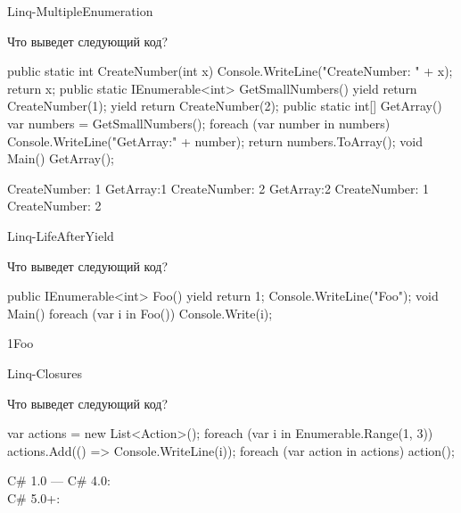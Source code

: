 \begin{defproblem}{Linq-MultipleEnumeration}
\begin{onlyproblem}
  Что выведет следующий код?
  \begin{source}
  public static int CreateNumber(int x)
  {
    Console.WriteLine("CreateNumber: " + x);
    return x;
  }
  public static IEnumerable<int> GetSmallNumbers()
  {    
    yield return CreateNumber(1);
    yield return CreateNumber(2);
  }
  public static int[] GetArray()
  {
    var numbers = GetSmallNumbers();
    foreach (var number in numbers)
      Console.WriteLine("GetArray:" + number);
    return numbers.ToArray();
  }
  void Main()
  {
    GetArray();
  }
  \end{source}
\end{onlyproblem}
\begin{onlysolution}
  \begin{source}
  CreateNumber: 1
  GetArray:1
  CreateNumber: 2
  GetArray:2
  CreateNumber: 1
  CreateNumber: 2
  \end{source}
\end{onlysolution}
\end{defproblem}
\begin{defproblem}{Linq-LifeAfterYield}
\begin{onlyproblem}
  Что выведет следующий код?
  \begin{source}
  public IEnumerable<int> Foo()
  {
    yield return 1;
    Console.WriteLine("Foo");
  }
  void Main()
  {
    foreach (var i in Foo())
      Console.Write(i);
  }
  \end{source}
\end{onlyproblem}
\begin{onlysolution}
  \begin{source}
  1Foo
  \end{source}
\end{onlysolution}
\end{defproblem}
\begin{defproblem}{Linq-Closures}
\begin{onlyproblem}
  Что выведет следующий код?
  \begin{source}
  var actions = new List<Action>();
  foreach (var i in Enumerable.Range(1, 3))
    actions.Add(() => Console.WriteLine(i));
  foreach (var action in actions)
    action();
  \end{source}
\end{onlyproblem}
\begin{onlysolution}
  C\# 1.0 — C\# 4.0: \\
  C\# 5.0+: 
\end{onlysolution}
\end{defproblem}
